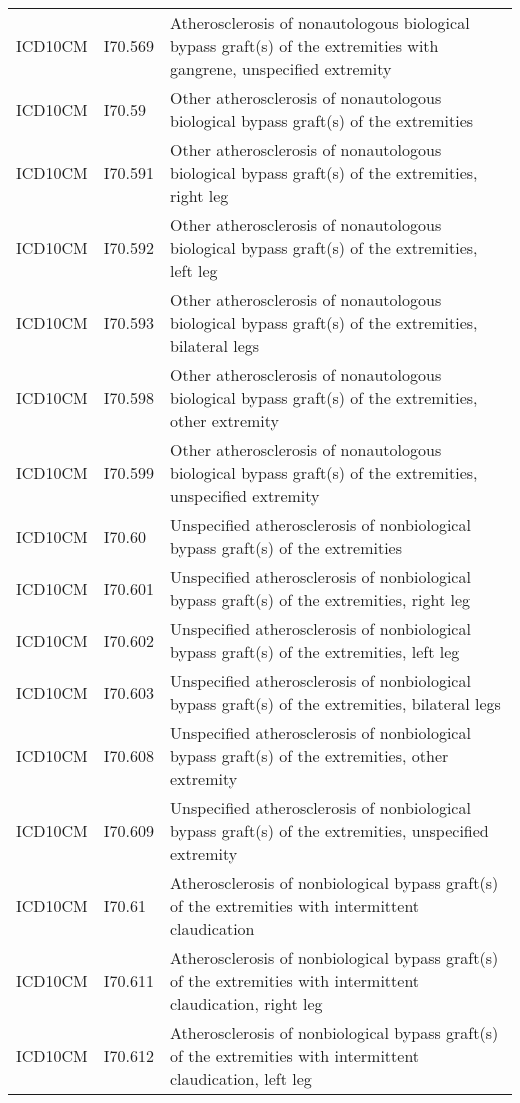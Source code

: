 \begin{longtable}{p{}p{}p{}}
  ICD10CM & I70.569 & Atherosclerosis of nonautologous biological bypass graft(s) of the extremities with gangrene, unspecified extremity \\ 
  ICD10CM & I70.59 & Other atherosclerosis of nonautologous biological bypass graft(s) of the extremities \\ 
  ICD10CM & I70.591 & Other atherosclerosis of nonautologous biological bypass graft(s) of the extremities, right leg \\ 
  ICD10CM & I70.592 & Other atherosclerosis of nonautologous biological bypass graft(s) of the extremities, left leg \\ 
  ICD10CM & I70.593 & Other atherosclerosis of nonautologous biological bypass graft(s) of the extremities, bilateral legs \\ 
  ICD10CM & I70.598 & Other atherosclerosis of nonautologous biological bypass graft(s) of the extremities, other extremity \\ 
  ICD10CM & I70.599 & Other atherosclerosis of nonautologous biological bypass graft(s) of the extremities, unspecified extremity \\ 
  ICD10CM & I70.60 & Unspecified atherosclerosis of nonbiological bypass graft(s) of the extremities \\ 
  ICD10CM & I70.601 & Unspecified atherosclerosis of nonbiological bypass graft(s) of the extremities, right leg \\ 
  ICD10CM & I70.602 & Unspecified atherosclerosis of nonbiological bypass graft(s) of the extremities, left leg \\ 
  ICD10CM & I70.603 & Unspecified atherosclerosis of nonbiological bypass graft(s) of the extremities, bilateral legs \\ 
  ICD10CM & I70.608 & Unspecified atherosclerosis of nonbiological bypass graft(s) of the extremities, other extremity \\ 
  ICD10CM & I70.609 & Unspecified atherosclerosis of nonbiological bypass graft(s) of the extremities, unspecified extremity \\ 
  ICD10CM & I70.61 & Atherosclerosis of nonbiological bypass graft(s) of the extremities with intermittent claudication \\ 
  ICD10CM & I70.611 & Atherosclerosis of nonbiological bypass graft(s) of the extremities with intermittent claudication, right leg \\ 
  ICD10CM & I70.612 & Atherosclerosis of nonbiological bypass graft(s) of the extremities with intermittent claudication, left leg \\ 

\end{longtable}
